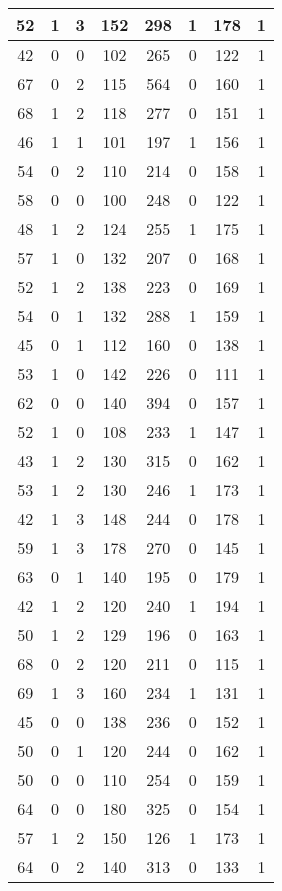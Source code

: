 \documentclass{article}
\begin{document}
\begin{longtable}{|c|c|c|c|c|c|c|c|}
52 & 1 & 3 & 152 & 298 & 1 & 178 & 1 \\ \hline
42 & 0 & 0 & 102 & 265 & 0 & 122 & 1 \\ \hline
67 & 0 & 2 & 115 & 564 & 0 & 160 & 1 \\ \hline
68 & 1 & 2 & 118 & 277 & 0 & 151 & 1 \\ \hline
46 & 1 & 1 & 101 & 197 & 1 & 156 & 1 \\ \hline
54 & 0 & 2 & 110 & 214 & 0 & 158 & 1 \\ \hline
58 & 0 & 0 & 100 & 248 & 0 & 122 & 1 \\ \hline
48 & 1 & 2 & 124 & 255 & 1 & 175 & 1 \\ \hline
57 & 1 & 0 & 132 & 207 & 0 & 168 & 1 \\ \hline
52 & 1 & 2 & 138 & 223 & 0 & 169 & 1 \\ \hline
54 & 0 & 1 & 132 & 288 & 1 & 159 & 1 \\ \hline
45 & 0 & 1 & 112 & 160 & 0 & 138 & 1 \\ \hline
53 & 1 & 0 & 142 & 226 & 0 & 111 & 1 \\ \hline
62 & 0 & 0 & 140 & 394 & 0 & 157 & 1 \\ \hline
52 & 1 & 0 & 108 & 233 & 1 & 147 & 1 \\ \hline
43 & 1 & 2 & 130 & 315 & 0 & 162 & 1 \\ \hline
53 & 1 & 2 & 130 & 246 & 1 & 173 & 1 \\ \hline
42 & 1 & 3 & 148 & 244 & 0 & 178 & 1 \\ \hline
59 & 1 & 3 & 178 & 270 & 0 & 145 & 1 \\ \hline
63 & 0 & 1 & 140 & 195 & 0 & 179 & 1 \\ \hline
42 & 1 & 2 & 120 & 240 & 1 & 194 & 1 \\ \hline
50 & 1 & 2 & 129 & 196 & 0 & 163 & 1 \\ \hline
68 & 0 & 2 & 120 & 211 & 0 & 115 & 1 \\ \hline
69 & 1 & 3 & 160 & 234 & 1 & 131 & 1 \\ \hline
45 & 0 & 0 & 138 & 236 & 0 & 152 & 1 \\ \hline
50 & 0 & 1 & 120 & 244 & 0 & 162 & 1 \\ \hline
50 & 0 & 0 & 110 & 254 & 0 & 159 & 1 \\ \hline
64 & 0 & 0 & 180 & 325 & 0 & 154 & 1 \\ \hline
57 & 1 & 2 & 150 & 126 & 1 & 173 & 1 \\ \hline
64 & 0 & 2 & 140 & 313 & 0 & 133 & 1 \\ \hline

\end{longtable}
\end{document}
